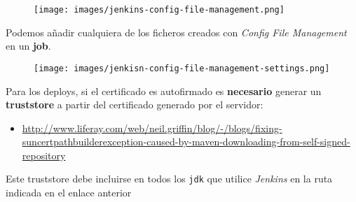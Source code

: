 \begin{figure}[htbp]
\centering
\texttt{[image: images/jenkins-config-file-management.png]}
\caption{}
\end{figure}

Podemos añadir cualquiera de los ficheros creados con \emph{Config File
Management} en un \textbf{job}.

\begin{figure}[htbp]
\centering
\texttt{[image: images/jenkisn-config-file-management-settings.png]}
\caption{}
\end{figure}

Para los deploys, si el certificado es autofirmado es \textbf{necesario}
generar un \textbf{truststore} a partir del certificado generado por el
servidor:

\begin{itemize}
\item
  \href{http://www.liferay.com/web/neil.griffin/blog/-/blogs/fixing-suncertpathbuilderexception-caused-by-maven-downloading-from-self-signed-repository}{http://www.liferay.com/web/neil.griffin/blog/-/blogs/fixing-suncertpathbuilderexception-caused-by-maven-downloading-from-self-signed-repository}
\end{itemize}
Este truststore debe incluirse en todos los \texttt{jdk} que utilice
\emph{Jenkins} en la ruta indicada en el enlace anterior

